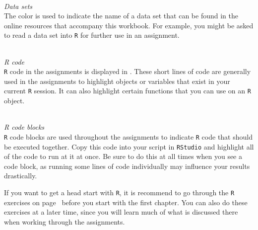  \\ 

\bigskip

\textit{Data sets} \\

The color  is used to indicate the name of a data set that can be found in the online resources that accompany this workbook. For example, you might be asked to read a data set into \texttt{R} for further use in an assignment. \\

 \\

\bigskip 

\textit{R code} \\ 

\texttt{R} code in the assignments is displayed in . These short lines of code are generally used in the assignments to highlight objects or variables that exist in your current \texttt{R} session. It can also highlight certain functions that you can use on an \texttt{R} object. \\

 \\ 

\bigskip

\textit{R code blocks} \\ 

\texttt{R} code blocks are used throughout the assignments to indicate \texttt{R} code that should be executed together. Copy this code into your script in \texttt{RStudio} and highlight all of the code to run at it at once. Be sure to do this at all times when you see a code block, as running some lines of code individually may influence your results drastically. \\


If you want to get a head start with \texttt{R}, it is recommend to go through the \texttt{R} exercises on page~\pageref{rexercises} before you start with the first chapter. You can also do these exercises at a later time, since you will learn much of what is discussed there when working through the assignments.

\clearpage %
